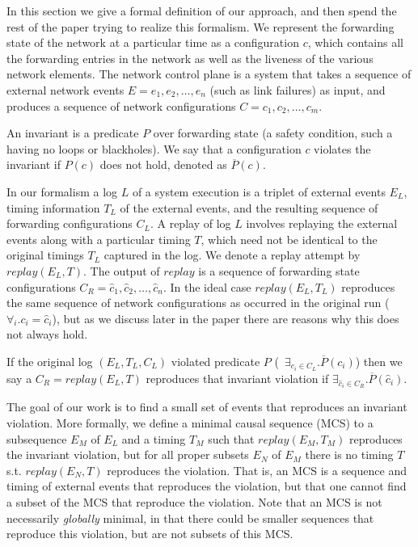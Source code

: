 In this section we give a formal definition of our approach, and then spend
the rest of the paper trying to realize this formalism. We represent the forwarding state of the network
at a particular time as a configuration $c$, which contains all the forwarding
entries in the network
as well as the liveness of the various network elements.
The network control plane is a system that takes a sequence of
external network events $E = e_1,e_2,\dots,e_n$ (such as link failures) as input,
and produces a sequence of network configurations
$C = c_1,c_2,\dots,c_m$.

An invariant is a predicate $P$ over forwarding state (a safety
condition, such a having no loops or blackholes). We say that a configuration
$c$ violates the invariant if $P(c)$ does not
hold, denoted as $\overline{P}(c)$.

In our formalism a log $L$ of a system execution is a triplet of external events $E_L$,
timing information $T_L$ of the external events, and the resulting sequence of forwarding
configurations $C_L$.
A replay of log $L$ involves replaying the external events along with a
particular timing $T$,
which need not be identical to the original timings $T_L$ captured in the log.
We denote a replay attempt by $replay(E_L,T)$.
The output of $replay$ is a sequence of forwarding state configurations
$C_R = \hat{c}_1,\hat{c}_2,\dots,\hat{c}_n$. In the ideal case $replay(E_L,T_L)$ reproduces the same
sequence of network configurations as occurred in the original run
(\ie~$\forall_i. c_i = \hat{c}_i$), but as we discuss later in the paper there are reasons why
this does not always hold.

If the original log $(E_L, T_L, C_L)$ violated predicate $P$
(\ie~$\exists_{c_i \in C_L}. \overline{P}(c_i)$)
then we say a $C_R = replay(E_L,T)$ reproduces that invariant violation if
$\exists_{\hat{c}_i \in C_R}. \overline{P}(\hat{c}_i)$.

The goal of our work is to find a small set of events that reproduces an invariant violation.  More formally, we define a minimal causal sequence (MCS) to a subsequence $E_M$
of $E_L$ and a timing $T_M$ such
that $replay(E_M,T_M)$ reproduces the invariant violation, but for all proper
subsets $E_N$ of $E_M$
there is no timing $T$ s.t. $replay(E_N,T)$ reproduces the violation. That is, an MCS is a sequence and timing of external events that reproduces the violation, but that one cannot find a subset of the MCS that reproduce the violation.  Note that an MCS is not necessarily {\em globally} minimal, in that there could be smaller sequences that reproduce this violation, but are not subsets of this MCS.

